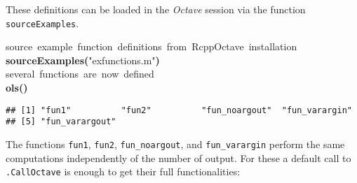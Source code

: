\documentclass[english,10pt,a4paper]{article}\usepackage{graphicx, color}
\makeatletter
\newcommand{\hlfunctioncall}[1]{\textcolor[rgb]{0.501960784313725,0,0.329411764705882}{\textbf{#1}}}%
\newcommand{\hlstring}[1]{\textcolor[rgb]{0.6,0.6,1}{#1}}%
\newcommand{\hlkeyword}[1]{\textcolor[rgb]{0,0,0}{\textbf{#1}}}%
\newcommand{\hlcomment}[1]{\textcolor[rgb]{0.180392156862745,0.6,0.341176470588235}{#1}}%
\newcommand{\hlstd}[1]{\textcolor[rgb]{0,0,0}{#1}}%
\newenvironment{kframe}{%
 \def\FrameCommand##1{\hskip\@totalleftmargin \hskip-\fboxsep
 \colorbox{shadecolor}{##1}\hskip-\fboxsep
     \hskip-\linewidth \hskip-\@totalleftmargin \hskip\columnwidth}%
 \MakeFramed {\advance\hsize-\width
   \@totalleftmargin\z@ \linewidth\hsize
   \@setminipage}}%
 {\par\unskip\endMakeFramed}
\newenvironment{knitrout}{}{} %
\let\proglang=\textit
\let\code=\texttt
\newcommand{\octave}{\proglang{Octave}\xspace}
\makeatother
\begin{document}
These definitions can be loaded in the \octave session via the function
\code{sourceExamples}.

\begin{knitrout}
\color{fgcolor}\begin{kframe}
\begin{flushleft}
\ttfamily\noindent
\hlcomment{\usebox{\hlnormalsizeboxhash}{\ }source{\ }example{\ }function{\ }definitions{\ }from{\ }RcppOctave{\ }installation}\hspace*{\fill}\\
\hlstd{}\hlfunctioncall{sourceExamples}\hlkeyword{(}\hlstring{"{}ex\usebox{\hlnormalsizeboxunderscore}functions.m"{}}\hlkeyword{)}\hspace*{\fill}\\
\hlstd{}\hlcomment{\usebox{\hlnormalsizeboxhash}{\ }several{\ }functions{\ }are{\ }now{\ }defined}\hspace*{\fill}\\
\hlstd{}\hlfunctioncall{o\usebox{\hlnormalsizeboxunderscore}ls}\hlkeyword{(}\hlkeyword{)}\mbox{}
\normalfont
\end{flushleft}
\begin{verbatim}
## [1] "fun1"          "fun2"          "fun_noargout"  "fun_varargin" 
## [5] "fun_varargout"
\end{verbatim}
\end{kframe}
\end{knitrout}


The functions \code{fun1}, \code{fun2}, \code{fun\_noargout}, and
\code{fun\_varargin} perform the same computations independently of the number
of output.
For these a default call to \code{.CallOctave} is enough to get their full
functionalities:
\end{document}
